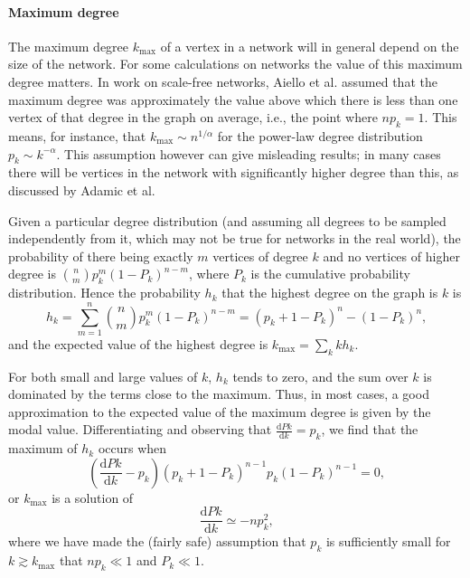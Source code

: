       \paragraph{Maximum degree}
      
        The maximum degree $k_{\mbox{max}}$ of a vertex in a network will in general depend on the size of the network. For some calculations on networks the value of this maximum degree matters. In work on scale-free networks, Aiello et al. \cite{AielloChungLu2000} assumed that the maximum degree was approximately the value above which there is less than one vertex of that degree in the graph on average, i.e., the point where $np_k = 1$. This means, for instance, that $k_{\mbox{max}} \sim n^{1/\alpha}$ for the power-law degree distribution $p_k \sim k^{−\alpha}$. This assumption however can give misleading results; in many cases there will be vertices in the network with significantly higher degree than this, as discussed by Adamic et al.\cite{AdamicLukosePuniyaniHuberman2001}
        
        Given a particular degree distribution (and assuming all degrees to be sampled independently from it, which may not be true for networks in the real world), the probability of there being exactly $m$ vertices of degree $k$ and no vertices of higher degree is $\binom{n}{m} p^m_k (1 − P_k)^{n−m}$, where $P_k$ is the cumulative probability distribution. Hence the probability $h_k$ that the highest degree on the graph is $k$ is
        \begin{equation}
          h_k = \sum_{m=1}^n \binom{n}{m} p^m_k (1 - P_k)^{n-m} = (p_k + 1 - P_k)^n - (1 - P_k)^n\mbox{,}
        \end{equation}
        and the expected value of the highest degree is $k_{\mbox{max}} = \sum_k kh_k$.
        
        For both small and large values of $k$, $h_k$ tends to zero, and the sum over $k$ is dominated by the terms close to the maximum. Thus, in most cases, a good approximation to the expected value of the maximum degree is given by the modal value. Differentiating and observing that $\frac{\mbox{d}Pk}{\mbox{d}k} = p_k$, we find that the maximum of $h_k$ occurs when
        \begin{equation}
          \left(\frac{\mbox{d}Pk}{\mbox{d}k} - p_k\right)(p_k + 1 - P_k)^{n-1} p_k(1 - P_k)^{n-1} = 0\mbox{,}
        \end{equation}
        or $k_{\mbox{max}}$ is a solution of
        \begin{equation}
          \frac{\mbox{d}Pk}{\mbox{d}k} \simeq -np^2_k\mbox{,}
        \end{equation}
        where we have made the (fairly safe) assumption that $p_k$ is sufficiently small for $k \gtrsim k_{\mbox{max}}$ that $np_k \ll 1$ and $P_k \ll 1$.
        
